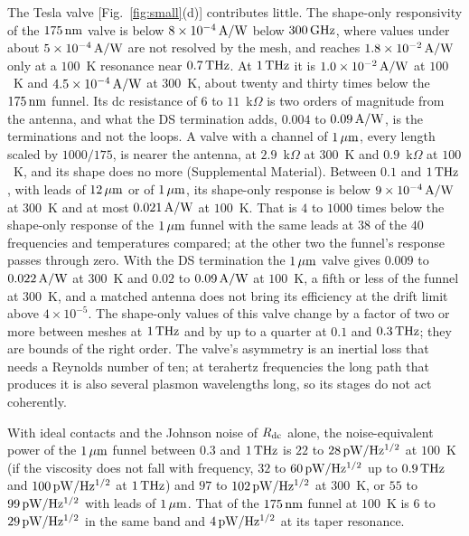 The Tesla valve [Fig.~\ref{fig:small}(d)] contributes little. The
shape-only responsivity of the $175\,\mathrm{nm}$ valve is below
$8\times10^{-4}\,\mathrm{A/W}$ below $300\,\mathrm{GHz}$, where values under about
$5\times10^{-4}\,\mathrm{A/W}$ are not resolved by the mesh, and reaches
$1.8\times10^{-2}\,\mathrm{A/W}$ only at a $100$~K resonance near $0.7\,\mathrm{THz}$. At
$1\,\mathrm{THz}$ it is $1.0\times10^{-2}\,\mathrm{A/W}$ at $100$~K and $4.5\times10^{-4}\,\mathrm{A/W}$
at $300$~K, about twenty and thirty times below the $175\,\mathrm{nm}$ funnel. Its
dc resistance of $6$ to $11$~k$\Omega$ is two orders of magnitude from
the antenna, and what the DS termination adds, $0.004$ to $0.09\,\mathrm{A/W}$, is
the terminations and not the loops. A valve with a channel of $1\,\mu\mathrm{m}$,
every length scaled by $1000/175$, is nearer the antenna, at
$2.9$~k$\Omega$ at $300$~K and $0.9$~k$\Omega$ at $100$~K, and its shape
does no more (Supplemental Material). Between $0.1$ and $1\,\mathrm{THz}$, with
leads of $12\,\mu\mathrm{m}$ or of $1\,\mu\mathrm{m}$, its shape-only response is below
$9\times10^{-4}\,\mathrm{A/W}$ at $300$~K and at most $0.021\,\mathrm{A/W}$ at $100$~K. That is
$4$ to $1000$ times below the shape-only response of the $1\,\mu\mathrm{m}$ funnel
with the same leads at $38$ of the $40$ frequencies and temperatures
compared; at the other two the funnel's response passes through zero.
With the DS termination the $1\,\mu\mathrm{m}$ valve gives $0.009$ to $0.022\,\mathrm{A/W}$ at
$300$~K and $0.02$ to $0.09\,\mathrm{A/W}$ at $100$~K, a fifth or less of the funnel
at $300$~K, and a matched antenna does not bring its efficiency at the
drift limit above $4\times10^{-5}$. The shape-only values of this valve
change by a factor of two or more between meshes at $1\,\mathrm{THz}$ and by up to
a quarter at $0.1$ and $0.3\,\mathrm{THz}$; they are bounds of the right order. The
valve's asymmetry is an inertial loss that needs a Reynolds number of
ten; at terahertz frequencies the long path that produces it is also
several plasmon wavelengths long, so its stages do not act coherently.

With ideal contacts and the Johnson noise of $R_{\mathrm{dc}}$ alone, the
noise-equivalent power of the $1\,\mu\mathrm{m}$ funnel between $0.3$ and $1\,\mathrm{THz}$ is
$22$ to $28\,\mathrm{pW/Hz^{1/2}}$ at $100$~K (if the viscosity does not fall with
frequency, $32$ to $60\,\mathrm{pW/Hz^{1/2}}$ up to $0.9\,\mathrm{THz}$ and $100\,\mathrm{pW/Hz^{1/2}}$ at
$1\,\mathrm{THz}$) and $97$ to $102\,\mathrm{pW/Hz^{1/2}}$ at $300$~K, or $55$ to $99\,\mathrm{pW/Hz^{1/2}}$
with leads of $1\,\mu\mathrm{m}$. That of the $175\,\mathrm{nm}$ funnel at $100$~K is $6$ to
$29\,\mathrm{pW/Hz^{1/2}}$ in the same band and $4\,\mathrm{pW/Hz^{1/2}}$ at its taper resonance.

